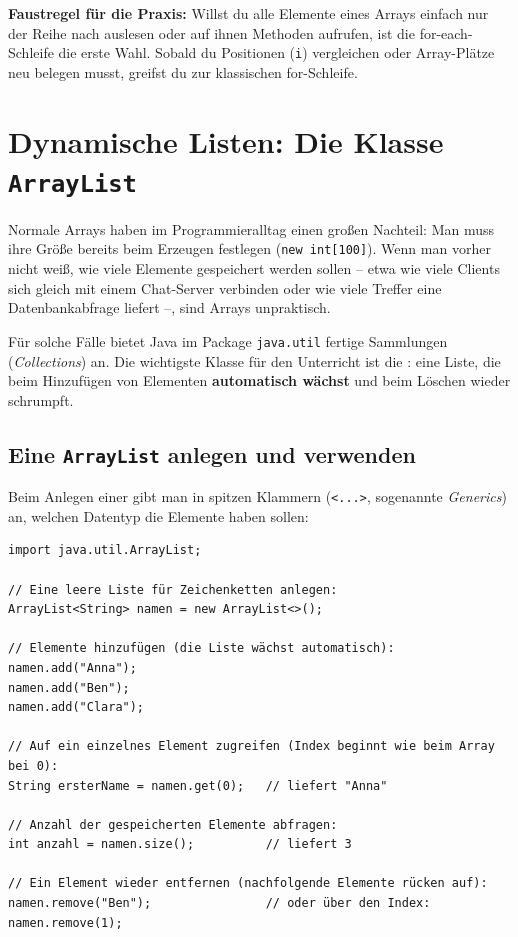 \textbf{Faustregel für die Praxis:} Willst du alle Elemente eines Arrays einfach 
nur der Reihe nach auslesen oder auf ihnen Methoden aufrufen, ist die for-each-Schleife 
die erste Wahl. Sobald du Positionen (\lstinline|i|) vergleichen oder Array-Plätze neu 
belegen musst, greifst du zur klassischen for-Schleife.


\section{Dynamische Listen: Die Klasse \texttt{ArrayList} \tagLK}

Normale Arrays haben im Programmieralltag einen großen Nachteil: Man muss ihre
Größe bereits beim Erzeugen festlegen (\lstinline|new int[100]|). Wenn man
vorher nicht weiß, wie viele Elemente gespeichert werden sollen -- etwa wie viele
Clients sich gleich mit einem Chat-Server verbinden oder wie viele Treffer eine
Datenbankabfrage liefert --, sind Arrays unpraktisch.

Für solche Fälle bietet Java im Package \texttt{java.util} fertige
Sammlungen (\emph{Collections}) an. Die wichtigste Klasse für den Unterricht
ist die : eine Liste, die beim Hinzufügen von Elementen
\textbf{automatisch wächst} und beim Löschen wieder schrumpft.


\subsection{Eine \texttt{ArrayList} anlegen und verwenden}

Beim Anlegen einer  gibt man in spitzen Klammern
(\texttt{<...>}, sogenannte \emph{Generics}) an, welchen Datentyp die Elemente
haben sollen:

\begin{lstlisting}
import java.util.ArrayList;

// Eine leere Liste für Zeichenketten anlegen:
ArrayList<String> namen = new ArrayList<>();

// Elemente hinzufügen (die Liste wächst automatisch):
namen.add("Anna");
namen.add("Ben");
namen.add("Clara");

// Auf ein einzelnes Element zugreifen (Index beginnt wie beim Array bei 0):
String ersterName = namen.get(0);   // liefert "Anna"

// Anzahl der gespeicherten Elemente abfragen:
int anzahl = namen.size();          // liefert 3

// Ein Element wieder entfernen (nachfolgende Elemente rücken auf):
namen.remove("Ben");                // oder über den Index: namen.remove(1);
\end{lstlisting}

